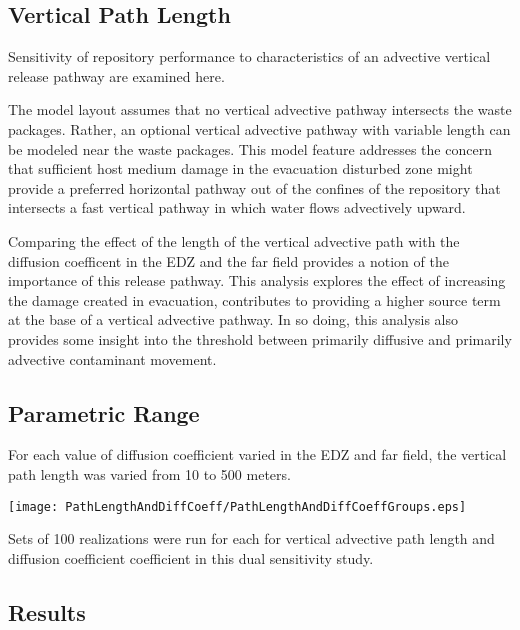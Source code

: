 
\subsection{Vertical Path Length}

Sensitivity of repository performance to characteristics of an advective 
vertical release pathway are examined here.

The model layout assumes that no vertical advective pathway intersects the waste 
packages. Rather, an optional vertical advective pathway with variable length 
can be modeled near the waste packages. This model feature addresses the concern 
that sufficient host medium damage in the evacuation disturbed zone might 
provide a preferred horizontal pathway out of the confines of the repository 
that intersects a fast vertical pathway in which water flows advectively 
upward.

Comparing the effect of the length of the vertical advective path with the 
diffusion coefficent in the \gls{EDZ} and the far field 
provides a notion of the importance of this release pathway. This analysis 
explores the effect of increasing the damage created in evacuation,  
contributes to providing a higher source term at the base of a vertical 
advective pathway. In so doing, this analysis also provides some insight into 
the threshold between primarily diffusive and primarily advective contaminant 
movement. 



\subsection{Parametric Range}

For each value of diffusion coefficient varied in the \gls{EDZ} and far field, 
the vertical path length was varied from 10 to 500 meters.

\begin{table}[ht!]
\centering
\texttt{[image: PathLengthAndDiffCoeff/PathLengthAndDiffCoeffGroups.eps]}
\caption{Sets of 100 realizations were run for each for vertical advective path 
length and diffusion coefficient coefficient in this dual sensitivity study.}
\label{tab:PathLengthAndDiffCoeffGroups}
\end{table}

\subsection{Results}

